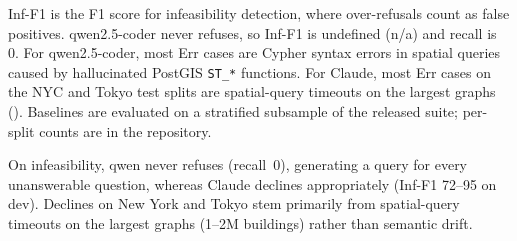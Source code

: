 \documentclass[sigconf,authordraft]{acmart}
\begin{document}
\begin{table}[ht!]
  \smallskip\raggedright\footnotesize
  Inf-F1 is the F1 score for infeasibility detection, where over-refusals count as false positives. qwen2.5-coder never refuses, so Inf-F1 is undefined (n/a) and recall is 0. For qwen2.5-coder, most Err cases are Cypher syntax errors in spatial queries caused by hallucinated PostGIS \texttt{ST\_*} functions. For Claude, most Err cases on the NYC and Tokyo test splits are spatial-query timeouts on the largest graphs (). Baselines are evaluated on a stratified subsample of the released suite; per-split counts are in the repository. 
\end{table}
On infeasibility, qwen never refuses (recall~0), generating a query for every unanswerable question, whereas Claude declines appropriately (Inf-F1 72--95 on dev). 
Declines on New York and Tokyo stem primarily from spatial-query timeouts on the largest graphs (1--2M buildings) rather than semantic drift.

\end{document}
